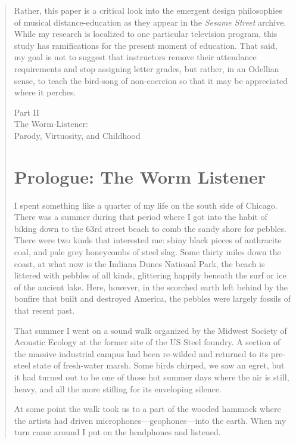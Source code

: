 \documentclass[12pt,letterpaper]{article}
\newcommand{\ses}{\textit{Sesame Street }}
\begin{document}
\begin{quote}
	Rather, this paper is a critical look into the emergent design 
	philosophies of musical distance-education as they appear in the \ses 
	archive. While my research is localized to one particular television 
	program, this study has ramifications for the present moment of 
	education. That said, my goal is not to suggest that instructors remove 
	their attendance requirements and stop assigning letter grades, but 
	rather, in an Odellian sense, to teach the bird-song of non-coercion 
	so that it may be appreciated where it perches.


	




	\newpage
	\thispagestyle{empty}
	\vspace*{30pt}
	\begin{center}
	{\Huge Part II\\ 
	\Large The Worm-Listener:\\
	Parody, Virtuosity, and Childhood}
	\end{center}


	\newpage
	\section*{Prologue: The Worm Listener}

	I spent something like a quarter of my life on the south side of 
	Chicago. There was a summer during that period where I got into the 
	habit of biking down to the 63rd street beach to comb the sandy shore 
	for pebbles. There were two kinds that interested me: shiny black 
	pieces of anthracite coal, and pale grey honeycombs of steel slag. Some
	thirty miles down the coast, at what now is the Indiana Dunes National 
	Park, the beach is littered with pebbles of all kinds, glittering 
	happily beneath the surf or ice of the ancient lake. Here, however, in 
	the scorched earth left behind by the bonfire that built and destroyed 
	America, the pebbles were largely fossils of that recent past.

	That summer I went on a sound walk organized by the Midwest Society of
	Acoustic Ecology at the former site of the US Steel foundry. A section 
	of the massive industrial campus had been re-wilded and returned to its
	pre-steel state of fresh-water marsh. Some birds chirped, we saw an 
	egret, but it had turned out to be one of those hot summer days where 
	the air is still, heavy, and all the more stifling for its enveloping 
	silence. 

	At some point the walk took us to a part of the wooded hammock where 
	the artists had driven microphones---geophones---into the earth. When 
	my turn came around I put on the headphones and listened. 


\end{quote}
\end{document}
